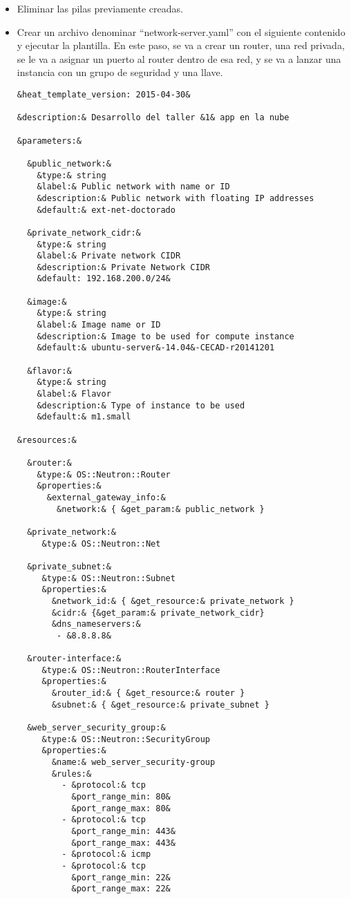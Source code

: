 \documentclass[10pt]{article}   			%
\begin{document}
\begin{itemize}
\item Eliminar las pilas previamente creadas.
\item Crear un archivo denominar “network-server.yaml” con el siguiente contenido y ejecutar la plantilla. En este paso, se va a crear un router, una red privada, se le va a asignar un puerto al router dentro de esa red, y se va a lanzar una instancia con un grupo de seguridad y una llave.
\begin{small}
\begin{lstlisting}[frame=single,style=base]	
&heat_template_version: 2015-04-30&

&description:& Desarrollo del taller &1& app en la nube

&parameters:&

  &public_network:&
    &type:& string
    &label:& Public network with name or ID
    &description:& Public network with floating IP addresses
    &default:& ext-net-doctorado

  &private_network_cidr:&
    &type:& string
    &label:& Private network CIDR
    &description:& Private Network CIDR
    &default: 192.168.200.0/24&

  &image:&
    &type:& string
    &label:& Image name or ID
    &description:& Image to be used for compute instance
    &default:& ubuntu-server&-14.04&-CECAD-r20141201

  &flavor:&
    &type:& string
    &label:& Flavor
    &description:& Type of instance to be used
    &default:& m1.small

&resources:&

  &router:&
    &type:& OS::Neutron::Router
    &properties:&
      &external_gateway_info:&
        &network:& { &get_param:& public_network }

  &private_network:&
     &type:& OS::Neutron::Net

  &private_subnet:&
     &type:& OS::Neutron::Subnet
     &properties:&
       &network_id:& { &get_resource:& private_network }
       &cidr:& {&get_param:& private_network_cidr}
       &dns_nameservers:& 
        - &8.8.8.8&

  &router-interface:&
     &type:& OS::Neutron::RouterInterface
     &properties:&
       &router_id:& { &get_resource:& router }
       &subnet:& { &get_resource:& private_subnet } 

  &web_server_security_group:&
     &type:& OS::Neutron::SecurityGroup
     &properties:&
       &name:& web_server_security-group
       &rules:&
         - &protocol:& tcp
           &port_range_min: 80&
           &port_range_max: 80&
         - &protocol:& tcp
           &port_range_min: 443&
           &port_range_max: 443&
         - &protocol:& icmp
         - &protocol:& tcp
           &port_range_min: 22&
           &port_range_max: 22&


\end{lstlisting}
\end{small}
\end{itemize}
\end{document}
